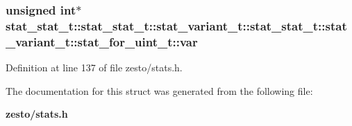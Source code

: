 \subsubsection[{var}]{\setlength{\rightskip}{0pt plus 5cm}unsigned int$\ast$ stat\_\-stat\_\-t::stat\_\-stat\_\-t::stat\_\-variant\_\-t::stat\_\-stat\_\-t::stat\_\-variant\_\-t::stat\_\-for\_\-uint\_\-t::var}\label{structstat__stat__t_1_1stat__variant__t_1_1stat__for__uint__t_19e295ab1d59230b341d8bc975b21e50}




Definition at line 137 of file zesto/stats.h.

The documentation for this struct was generated from the following file:\begin{CompactItemize}
\item 
{\bf zesto/stats.h}\end{CompactItemize}
